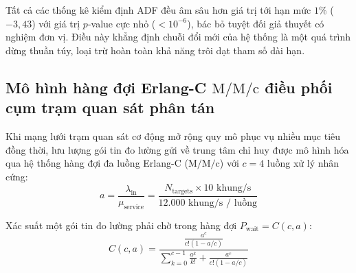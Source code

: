 \begin{table}[H]
\centering
\caption{Kết quả kiểm định tính dừng ADF trên chuỗi đổi mới 3 trục tọa độ ($N = 10.000$ mẫu)}
\label{tab:adf-stationarity-results-table}
\end{table}

Tất cả các thống kê kiểm định ADF đều âm sâu hơn giá trị tới hạn mức $1\%$ ($-3{,}43$) với giá trị $p$-value cực nhỏ ($< 10^{-6}$), bác bỏ tuyệt đối giả thuyết có nghiệm đơn vị. Điều này khẳng định chuỗi đổi mới của hệ thống là một quá trình dừng thuần túy, loại trừ hoàn toàn khả năng trôi dạt tham số dài hạn.

\subsection{Mô hình hàng đợi Erlang-C \texorpdfstring{$\text{M/M/c}$}{M/M/c} điều phối cụm trạm quan sát phân tán}

\hspace{0.5cm} Khi mạng lưới trạm quan sát cơ động mở rộng quy mô phục vụ nhiều mục tiêu đồng thời, lưu lượng gói tin đo lường gửi về trung tâm chỉ huy được mô hình hóa qua hệ thống hàng đợi đa luồng Erlang-C ($\text{M/M/c}$) với $c=4$ luồng xử lý nhân cứng:
\begin{equation}
a = \frac{\lambda_{\text{in}}}{\mu_{\text{service}}} = \frac{N_{\text{targets}} \times 10\text{ khung/s}}{12.000\text{ khung/s / luồng}}
\label{eq:erlang-traffic-intensity}
\end{equation}

Xác suất một gói tin đo lường phải chờ trong hàng đợi $P_{\text{wait}} = C(c, a)$:
\begin{equation}
C(c, a) = \frac{\frac{a^c}{c! (1 - a/c)}}{\sum_{k=0}^{c-1} \frac{a^k}{k!} + \frac{a^c}{c! (1 - a/c)}}
\label{eq:erlang-c-formula}
\end{equation}

